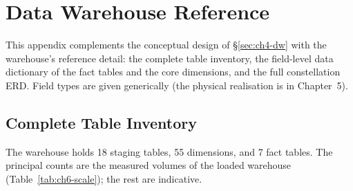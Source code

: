 \chapter{Data Warehouse Reference}
\label{anx:dw}

This appendix complements the conceptual design of \S\ref{sec:ch4-dw} with the warehouse's reference
detail: the complete table inventory, the field-level data dictionary of the fact tables and the core
dimensions, and the full constellation ERD. Field types are given generically (the physical
realisation is in Chapter~5).

\section{Complete Table Inventory}
\label{anx:dw-inventory}

The warehouse holds 18 staging tables, 55 dimensions, and 7 fact tables. The principal counts are the
measured volumes of the loaded warehouse (Table~\ref{tab:ch6-scale}); the rest are indicative.

